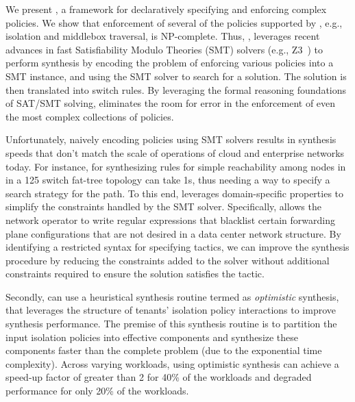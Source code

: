 We present \Name, a framework for declaratively specifying and
enforcing complex policies.  We show that enforcement of several of
the policies supported by \Name, e.g., isolation and middlebox
traversal, is NP-complete. Thus, \Name, leverages recent advances in
fast Satisfiability Modulo Theories (SMT) solvers (e.g., Z3~\cite{z3})
to perform synthesis by encoding the problem of enforcing various
policies into a SMT instance, and using the SMT solver to search for a
solution. The solution is then translated into switch rules. %
By leveraging the formal reasoning foundations of SAT/SMT solving,
\Name eliminates the room for error in the enforcement of even the
most complex collections of policies.

Unfortunately, naively encoding policies using SMT solvers results in
synthesis speeds that don't match the scale of operations of cloud and
enterprise networks today.  For instance, for synthesizing rules for simple
reachability among nodes in in a 125 switch fat-tree topology can take
1s,
thus needing a way to specify a search strategy for the path.  To this
end, \Name leverages domain-specific properties to simplify the
constraints handled by the SMT solver.  Specifically, \Name allows the
network operator to write regular expressions that blacklist certain
forwarding plane configurations  that are not desired in a data
center network structure.  
By identifying a restricted syntax for specifying
tactics, we can improve the synthesis procedure by reducing the
constraints added to the solver without additional constraints
required to ensure the solution satisfies the tactic. 

 Secondly, \Name can use a heuristical synthesis routine termed as
 \emph{optimistic} synthesis, that leverages the structure of tenants'
 isolation policy interactions to improve synthesis performance. The
 premise of this synthesis routine is to partition the input isolation
 policies into effective components and synthesize these components
 faster than the complete problem (due to the exponential time
 complexity). Across varying workloads, using optimistic synthesis can
 achieve a speed-up factor of greater than 2 for 40\% of the workloads
 and degraded performance for only 20\% of the workloads.   


